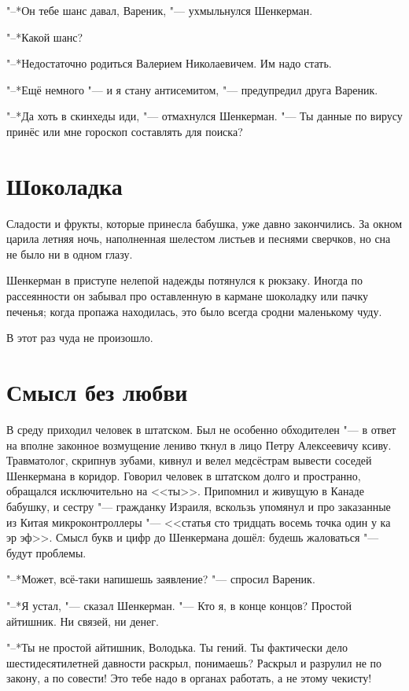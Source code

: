 "--*Он тебе шанс давал, Вареник, "--- ухмыльнулся Шенкерман.

"--*Какой шанс?

"--*Недостаточно родиться Валерием Николаевичем.
Им надо стать.

"--*Ещё немного "--- и я стану антисемитом, "--- предупредил друга Вареник.

"--*Да хоть в скинхеды иди, "--- отмахнулся Шенкерман.
"--- Ты данные по вирусу принёс или мне гороскоп составлять для поиска?

\section{Шоколадка}

Сладости и фрукты, которые принесла бабушка, уже давно закончились.
За окном царила летняя ночь, наполненная шелестом листьев и песнями сверчков, но сна не было ни в одном глазу.

Шенкерман в приступе нелепой надежды потянулся к рюкзаку.
Иногда по рассеянности он забывал про оставленную в кармане шоколадку или пачку печенья;
когда пропажа находилась, это было всегда сродни маленькому чуду.

В этот раз чуда не произошло.

\section{Смысл без любви}

В среду приходил человек в штатском.
Был не особенно обходителен "--- в ответ на вполне законное возмущение лениво ткнул в лицо Петру Алексеевичу ксиву.
Травматолог, скрипнув зубами, кивнул и велел медсёстрам вывести соседей Шенкермана в коридор.
Говорил человек в штатском долго и пространно, обращался исключительно на <<ты>>.
Припомнил и живущую в Канаде бабушку, и сестру "--- гражданку Израиля, вскользь упомянул и про заказанные из Китая микроконтроллеры "--- <<статья сто тридцать восемь точка один у ка эр эф>>.
Смысл букв и цифр до Шенкермана дошёл: будешь жаловаться "--- будут проблемы.

"--*Может, всё-таки напишешь заявление? "--- спросил Вареник.

"--*Я устал, "--- сказал Шенкерман.
"--- Кто я, в конце концов?
Простой айтишник.
Ни связей, ни денег.

"--*Ты не простой айтишник, Володька.
Ты гений.
Ты фактически дело шестидесятилетней давности раскрыл, понимаешь?
Раскрыл и разрулил не по закону, а по совести!
Это тебе надо в органах работать, а не этому чекисту!

